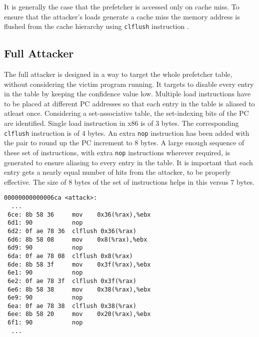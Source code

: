 It is generally the case that the prefetcher is accessed only
on cache miss. To ensure that the attacker's loads generate a cache miss
the memory address is flushed from the cache hierarchy using \texttt{clflush}
instruction \cite{intel-x86}.


\subsection{Full Attacker}

The full attacker is designed in a way to target the whole prefetcher table,
without considering the victim program running. It targets to disable every
entry in the table by keeping the confidence value low.
Multiple load instructions have to be placed at different PC addresses
so that each entry in the table is aliased to atleast once.
Considering a set-associative table, the set-indexing bits of the PC
are identified.
Single load instruction in x86 is of 3 bytes. The corresponding \texttt{clflush}
instruction is of 4 bytes. An extra \texttt{nop} instruction has been added
with the pair to round up the PC increment to 8 bytes.
A large enough sequence of these set of instructions, with extra \texttt{nop}
instructions wherever required, is generated to ensure aliasing
to every entry in the table. It is important that each entry gets a nearly
equal number of hits from the attacker, to be properly effective. The size of
8 bytes of the set of instructions helps in this versus 7 bytes.

\begin{lstlisting}[caption={Full Attacker disassembly: load misses at different PCs},
label={lst:full_attack}]
00000000000006ca <attack>:
  ...
 6ce: 8b 58 36     mov    0x36(%rax),%ebx
 6d1: 90           nop
 6d2: 0f ae 78 36  clflush 0x36(%rax)
 6d6: 8b 58 08     mov    0x8(%rax),%ebx
 6d9: 90           nop
 6da: 0f ae 78 08  clflush 0x8(%rax)
 6de: 8b 58 3f     mov    0x3f(%rax),%ebx
 6e1: 90           nop
 6e2: 0f ae 78 3f  clflush 0x3f(%rax)
 6e6: 8b 58 38     mov    0x38(%rax),%ebx
 6e9: 90           nop
 6ea: 0f ae 78 38  clflush 0x38(%rax)
 6ee: 8b 58 20     mov    0x20(%rax),%ebx
 6f1: 90           nop
  ...
\end{lstlisting}


